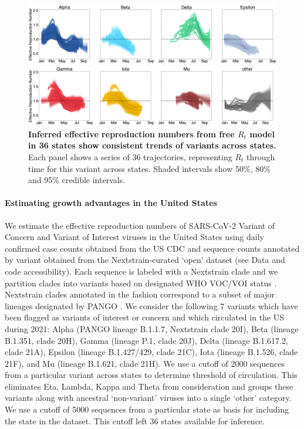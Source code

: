 \documentclass[11pt,oneside,letterpaper]{article}
\begin{document}
\begin{figure}[t]
  \centering
  \includegraphics[width=\linewidth]{figs/rt_consensus.png}
  \caption{\textbf{Inferred effective reproduction numbers from free $R_t$ model in 36 states show consistent trends of variants across states.}
  Each panel shows a series of 36 trajectories, representing $R_t$ through time for this variant across states.
  Shaded intervals show 50\%, 80\% and 95\% credible intervals.
  }
  \label{fig:rt_consensus}
\end{figure}

\paragraph{Estimating growth advantages in the United States}

We estimate the effective reproduction numbers of SARS-CoV-2 Variant of Concern and Variant of Interest viruses in the United States using daily confirmed case counts obtained from the US CDC and sequence counts annotated by variant obtained from the Nextstrain-curated `open' dataset \cite{Hadfield2018} (see Data and code accessibility).
Each sequence is labeled with a Nextstrain clade \cite{Hadfield2018} and we partition clades into variants based on designated WHO VOC/VOI status \cite{Konings2021}.
Nextstrain clades annotated in the fashion correspond to a subset of major lineages designated by PANGO \cite{Rambaut2020}.
We consider the following 7 variants which have been flagged as variants of interest or concern and which circulated in the US during 2021: Alpha (PANGO lineage B.1.1.7, Nextstrain clade 20I), Beta (lineage B.1.351, clade 20H), Gamma (lineage P.1, clade 20J), Delta (lineage B.1.617.2, clade 21A), Epsilon (lineage B.1.427/429, clade 21C), Iota (lineage B.1.526, clade 21F), and Mu (lineage B.1.621, clade 21H).
We use a cutoff of 2000 sequences from a particular variant across states to determine threshold of circulation.
This eliminates Eta, Lambda, Kappa and Theta from consideration and groups these variants along with ancestral `non-variant' viruses into a single `other' category.
We use a cutoff of 5000 sequences from a particular state as basis for including the state in the dataset.
This cutoff left 36 states available for inference.
\end{document}
